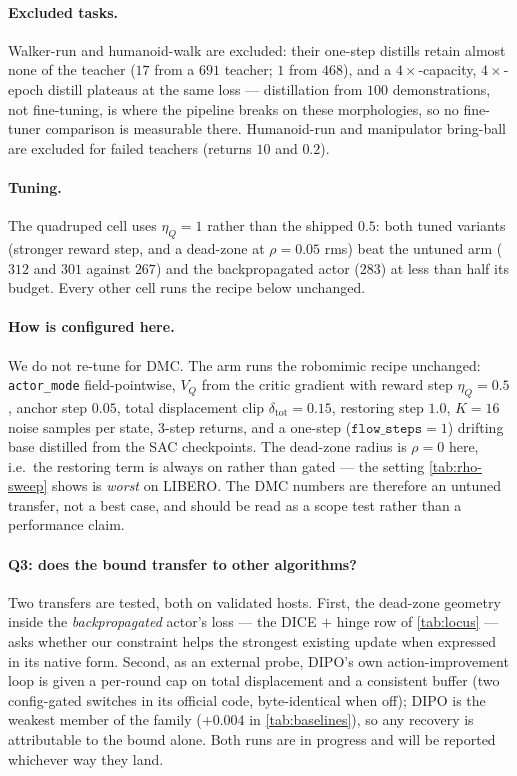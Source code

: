 \paragraph{Excluded tasks.} Walker-run and humanoid-walk are excluded: their
one-step distills retain almost none of the teacher ($17$ from a $691$
teacher; $1$ from $468$), and a $4\times$-capacity, $4\times$-epoch distill
plateaus at the same loss --- distillation from $100$ demonstrations, not
fine-tuning, is where the pipeline breaks on these morphologies, so no
fine-tuner comparison is measurable there. Humanoid-run and manipulator
bring-ball are excluded for failed teachers (returns $10$ and $0.2$).

\paragraph{Tuning.} The quadruped \method{} cell uses $\eta_Q{=}1$ rather
than the shipped $0.5$: both tuned variants (stronger reward step, and a
dead-zone at $\rho{=}0.05$ rms) beat the untuned arm ($312$ and $301$ against
$267$) and the backpropagated actor ($283$) at less than half its budget.
Every other \method{} cell runs the recipe below unchanged.

\paragraph{How \method{} is configured here.} We do not re-tune for DMC. The
arm runs the robomimic recipe unchanged: \texttt{actor\_mode} field-pointwise,
$V_Q$ from the critic gradient with reward step $\eta_Q{=}0.5$, anchor step
$0.05$, total displacement clip $\delta_{\mathrm{tot}}{=}0.15$, restoring step
$1.0$, $K{=}16$ noise samples per state, $3$-step returns, and a one-step
($\texttt{flow\_steps}{=}1$) drifting base distilled from the SAC checkpoints.
The dead-zone radius is $\rho{=}0$ here, i.e.\ the restoring term is always on
rather than gated --- the setting \cref{tab:rho-sweep} shows is \emph{worst} on
LIBERO. The DMC numbers are therefore an untuned transfer, not a best case,
and should be read as a scope test rather than a performance claim.


\paragraph{Q3: does the bound transfer to other algorithms?}
Two transfers are tested, both on validated hosts. First, the dead-zone
geometry inside the \emph{backpropagated} actor's loss --- the DICE $+$
hinge row of \cref{tab:locus} --- asks whether our constraint helps the
strongest existing update when expressed in its native form. Second, as an
external probe, DIPO's own action-improvement loop is given a per-round cap
on total displacement and a consistent buffer (two config-gated switches in
its official code, byte-identical when off); DIPO is the weakest member of
the family ($+0.004$ in \cref{tab:baselines}), so any recovery is
attributable to the bound alone. Both runs are in progress and will be
reported whichever way they land.

